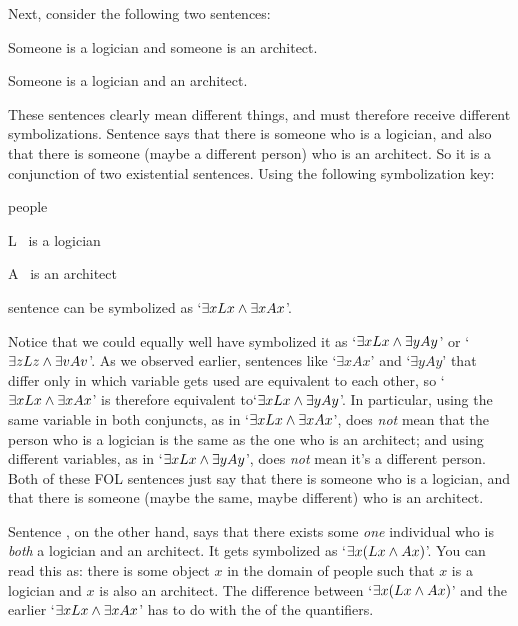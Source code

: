 
Next, consider the following two sentences:

	\begin{earg}
		\item[\ex{scope1}] Someone is a logician and someone is an architect.
		\item[\ex{scope2}] Someone is a logician and an architect.
	\end{earg}
These sentences clearly mean different things, and must therefore receive different symbolizations.  Sentence  says that there is someone who is a logician, and also that there is someone (maybe a different person) who is an architect. So it is a conjunction of two existential sentences. Using the following symbolization key:

	\begin{ekey}
		\item[\text{domain}] people
		\item[L] \blank\ is a logician
		\item[A]\blank\ is an architect
	\end{ekey}
sentence  can be symbolized as `$\exists xLx \wedge \exists xAx$'.

 Notice that we could equally well have symbolized it as `$\exists x Lx \wedge \exists yAy$' or `$\exists zLz \wedge \exists v Av$'.  As we observed earlier, sentences like `$\exists x Ax$' and `$\exists y Ay$' that differ only in which variable gets used are equivalent to each other, so  `$\exists xLx \wedge \exists xAx$' is therefore equivalent to`$\exists x Lx \wedge \exists yAy$'.  In particular, using the same variable in both conjuncts, as in `$\exists xLx \wedge \exists xAx$', does \emph{not} mean that the person who is a logician is the same as the one who is an architect; and using different variables, as in `$\exists x Lx \wedge \exists yAy$',  does \emph{not} mean it's a different person.  Both of these FOL sentences just say that there is someone who is a logician, and that there is someone (maybe the same, maybe different) who is an architect.



Sentence , on the other hand, says that there exists some \emph{one} individual who is \emph{both} a logician and an architect.  It gets symbolized as `$\exists x(Lx \wedge Ax)$'.   You can read this as: there is some object $x$ in the domain of people such that $x$ is a logician and $x$ is also an architect.  The difference between `$\exists x(Lx \wedge Ax)$'  and the earlier `$\exists xLx \wedge \exists xAx$' has to do with the  of the quantifiers.

